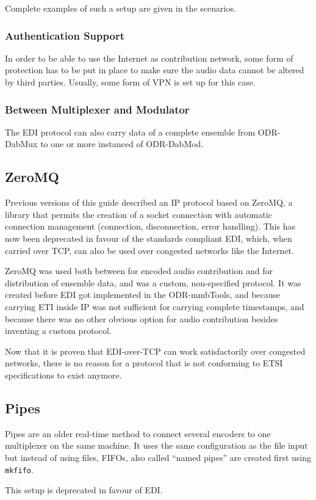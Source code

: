 Complete examples of such a setup are given in the scenarios.

\subsubsection{Authentication Support}
In order to be able to use the Internet as contribution network, some form of
protection has to be put in place to make sure the audio data cannot be altered
by third parties. Usually, some form of VPN is set up for this case.


\subsubsection{Between Multiplexer and Modulator}

The EDI protocol can also carry data of a complete ensemble from ODR-DabMux to
one or more instanced of ODR-DabMod.

\subsection{ZeroMQ}
\label{sec:zeromq}
Previous versions of this guide described an IP protocol based on
ZeroMQ, a library that permits the creation
of a socket connection with automatic connection management (connection,
disconnection, error handling). This has now been deprecated in favour of
the standards compliant EDI, which, when carried over TCP, can also be
used over congested networks like the Internet.

ZeroMQ was used both between for encoded audio contribution and for distribution
of ensemble data, and was a custom, non-specified protocol. It was created
before EDI got implemented in the ODR-mmbTools, and because carrying ETI inside
IP was not sufficient for carrying complete timestamps, and because there was no
other obvious option for audio contribution besides inventing a custom protocol.

Now that it is proven that EDI-over-TCP can work satisfactorily over congested
networks, there is no reason for a protocol that is not conforming to ETSI
specifications to exist anymore.

\subsection{Pipes}

Pipes are an older real-time method to connect several encoders to one
multiplexer on the same machine. It uses the same configuration as the file
input but instead of using files, FIFOs, also called ``named pipes'' are
created first using \texttt{mkfifo}.

This setup is deprecated in favour of EDI.

